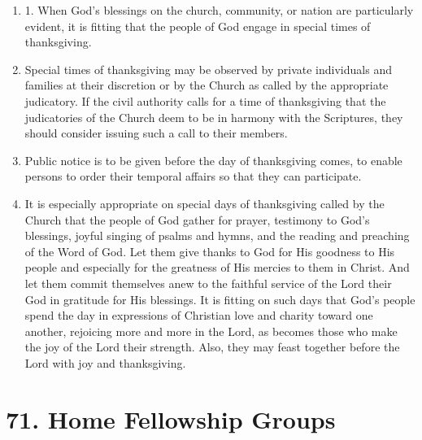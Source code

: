 \documentclass[
]{book}
\providecommand{\tightlist}{%
  \setlength{\itemsep}{0pt}\setlength{\parskip}{0pt}}
\begin{document}
\begin{enumerate}
\def\labelenumi{\arabic{enumi}.}
\tightlist
\item
  \protect\hypertarget{70}{\href{}{}}1. When God's blessings on the church, community, or nation are particularly evident, it is fitting that the people of God engage in special times of thanksgiving.
\item
  Special times of thanksgiving may be observed by private individuals and families at their discretion or by the Church as called by the appropriate judicatory. If the civil authority calls for a time of thanksgiving that the judicatories of the Church deem to be in harmony with the Scriptures, they should consider issuing such a call to their members.
\item
  Public notice is to be given before the day of thanksgiving comes, to enable persons to order their temporal affairs so that they can participate.
\item
  It is especially appropriate on special days of thanksgiving called by the Church that the people of God gather for prayer, testimony to God's blessings, joyful singing of psalms and hymns, and the reading and preaching of the Word of God. Let them give thanks to God for His goodness to His people and especially for the greatness of His mercies to them in Christ. And let them commit themselves anew to the faithful service of the Lord their God in gratitude for His blessings. It is fitting on such days that God's people spend the day in expressions of Christian love and charity toward one another, rejoicing more and more in the Lord, as becomes those who make the joy of the Lord their strength. Also, they may feast together before the Lord with joy and thanksgiving.
\end{enumerate}

\hypertarget{home-fellowship-groups}{%
\section*{71. Home Fellowship Groups}\label{home-fellowship-groups}}

\protect\hypertarget{chapter-slug-71-home-fellowship-groups}{\href{}{}}
\end{document}
